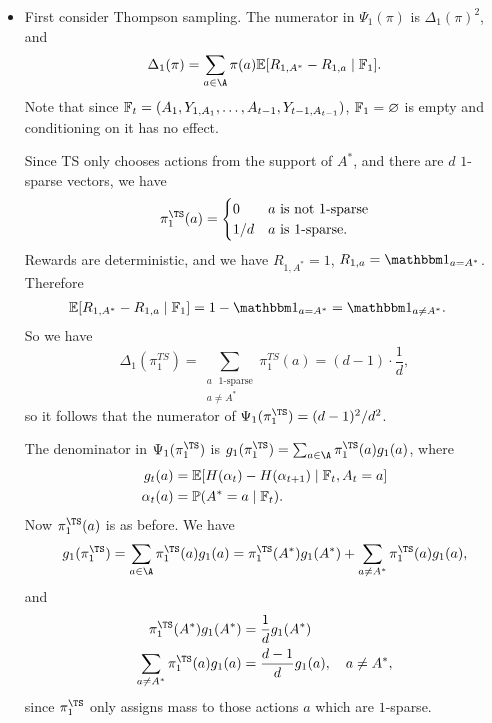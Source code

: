 \documentclass[11pt, openany]{book}
\begin{document}
\begin{example}
\begin{itemize}
            \begin{itemize}
                \item First consider Thompson sampling. The numerator in $\Psi_1(\pi)$ is $\Delta_1(\pi)^2$, and 
                    \[
                        \Delta_1(\pi)=\sum_{a\in\A} \pi(a)\E[R_{1,A^*} - R_{1,a}\given\F_1].
                    \]
                    Note that since $\mathbb{F}_t = (A_1,Y_{1,A_1},\dots,A_{t-1},Y_{t-1,A_{t-1}})$, $\mathbb{F}_1=\varnothing$ is empty and conditioning on it has no effect.

                    Since TS only chooses actions from the support of $A^*$, and there are $d$ $1$-sparse vectors, we have
                    \[
                        \pi_1^{\TS}(a) = \begin{cases}
                            0 & \text{$a$ is not $1$-sparse} \\
                            1/d & \text{$a$ is $1$-sparse}.
                        \end{cases}
                    \]
                    Rewards are deterministic, and we have $R_{1,A^*} = 1$, $R_{1,a} = \ind_{a=A^*}$. Therefore
                    \begin{align*}
                        \E[R_{1,A^*} - R_{1,a}\given\F_1] & = 1 - \ind_{a=A^*} = \ind_{a\neq A^*}.
                    \end{align*}
                    So we have
                    \[
                        \Delta_1(\pi_1^{TS}) = \sum_{\substack{\text{$a$ $1$-sparse}\\a\neq A^*}} \pi_1^{TS}(a) = (d-1)\cdot \frac{1}{d},
                    \]
                    so it follows that the numerator of $\Psi_1(\pi_1^{\TS}) = (d-1)^2/d^2$.

                    The denominator in $\Psi_1(\pi_1^{\TS})$ is $g_1(\pi_1^{\TS}) = \sum_{a\in\A} \pi_1^{\TS}(a)g_1(a)$, where
            \begin{align*}
                g_t(a) & = \mathbb{E}[H(\alpha_t) - H(\alpha_{t+1}) \mid\mathbb{F}_t, A_t=a] \\
                \alpha_t(a) & = \mathbb{P}(A^* = a \mid \mathbb{F}_t).
            \end{align*}
            Now $\pi_1^{\TS}(a)$ is as before. We have
            \[
                g_1(\pi_1^{\TS}) = \sum_{a\in\A} \pi_1^{\TS}(a)g_1(a) = \pi_1^{\TS}(A^*)g_1(A^*) + \sum_{a\neq A^*} \pi_1^{\TS}(a)g_1(a),
            \]
            and
            \begin{align*}
                \pi_1^{\TS}(A^*)g_1(A^*) & = \frac{1}{d}g_1(A^*) \\
                \sum_{a\neq A^*} \pi_1^{\TS}(a)g_1(a) & = \frac{d-1}{d} g_1(a), \quad a\neq A^*,
            \end{align*}
            since $\pi_1^{\TS}$ only assigns mass to those actions $a$ which are $1$-sparse.


\end{itemize}
\end{itemize}
\end{example}
\end{document}
